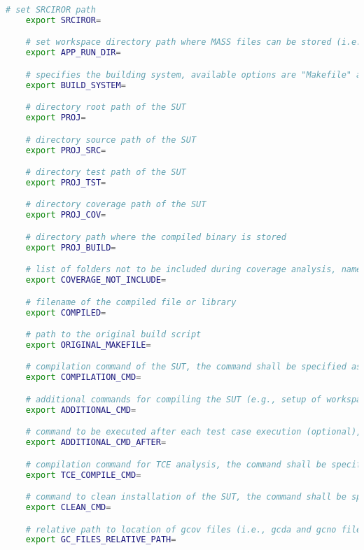 \begin{lstlisting}[language=bash,label=listing:MASS:conf,caption=Excerpt of mass\_conf.sh file.]
	# set SRCIROR path
	export SRCIROR=

	# set workspace directory path where MASS files can be stored (i.e., $INSTALL_DIR)
	export APP_RUN_DIR=

	# specifies the building system, available options are "Makefile" and "waf"
	export BUILD_SYSTEM=

	# directory root path of the SUT
	export PROJ=

	# directory source path of the SUT
	export PROJ_SRC=

	# directory test path of the SUT
	export PROJ_TST=

	# directory coverage path of the SUT
	export PROJ_COV=

	# directory path where the compiled binary is stored
	export PROJ_BUILD=

	# list of folders not to be included during coverage analysis, name folders shall be separated by '\|'
	export COVERAGE_NOT_INCLUDE=

	# filename of the compiled file or library
	export COMPILED=

	# path to the original build script
	export ORIGINAL_MAKEFILE=

	# compilation command of the SUT, the command shall be specified as a Bash array, e.g., (). Special characters shall be escaped.
	export COMPILATION_CMD=

	# additional commands for compiling the SUT (e.g., setup of workspace), the command shall be specified as a Bash array, e.g., (). Special characters shall be escaped.
	export ADDITIONAL_CMD=

	# command to be executed after each test case execution (optional), the command shall be specified as a Bash array, e.g., (). Special characters shall be escaped.
	export ADDITIONAL_CMD_AFTER=

	# compilation command for TCE analysis, the command shall be specified as a Bash array, e.g., (). Special characters shall be escaped.
	export TCE_COMPILE_CMD=

	# command to clean installation of the SUT, the command shall be specified as a Bash array, e.g., (). Special characters shall be escaped.
	export CLEAN_CMD=

	# relative path to location of gcov files (i.e., gcda and gcno files)
	export GC_FILES_RELATIVE_PATH=
\end{lstlisting}

